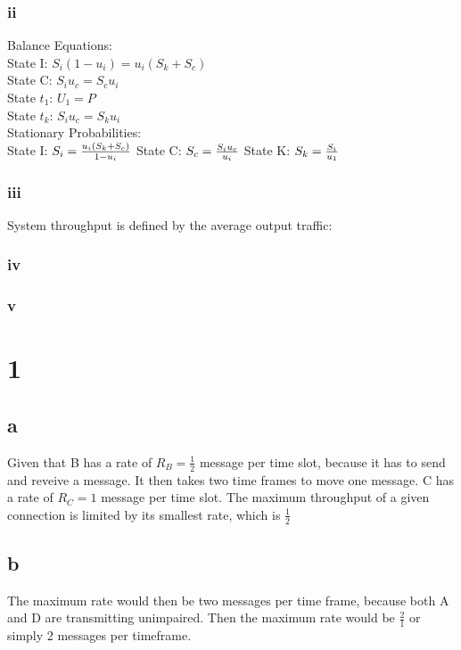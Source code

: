 \documentclass[10pt,letterpaper]{article}
\begin{document}
\subsubsection*{ii}
Balance Equations:\\
State I: $S_i(1-u_i)=u_i(S_k+S_c)$\\
State C: $S_iu_c=S_cu_i$\\
State $t_1$: $U_1 = P$ \\
State $t_k$: $S_iu_c=S_ku_i$ \\

Stationary Probabilities:\\

State I: $S_i=\frac{u_i(S_k+S_c)}{1-u_i}\\$
State C: $S_c=\frac{S_iu_c}{u_i}\\$
State K: $S_k=\frac{S_i}{u_1}\\$

\subsubsection*{iii}
System throughput is defined by the average output traffic:\\

\subsubsection*{iv}
\subsubsection*{v}

\section*{1}
\subsection*{a}
Given that B has a rate of $R_B=\frac{1}{2}$ message per time slot, because it
has to send and reveive a message. It then takes two time frames to move one 
message. C has a rate of $R_C = 1$ message per time slot.
The maximum throughput of a given connection is limited by its smallest rate,
which is $\frac{1}{2}$

\subsection*{b}
The maximum rate would then be two messages per time frame, because both A
and D are transmitting unimpaired. Then the maximum rate would be $\frac{2}{1}$
or simply 2 messages per timeframe.
\end{document}
